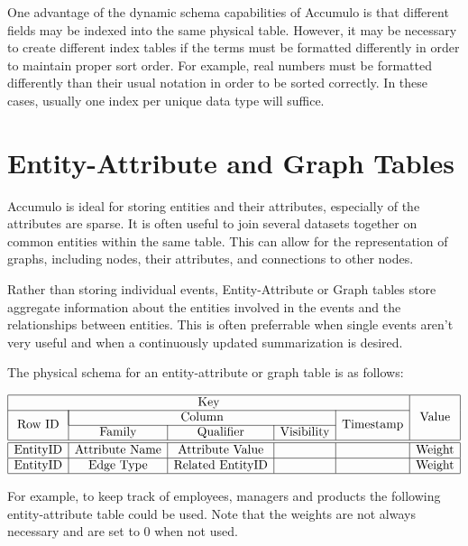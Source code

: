 One advantage of the dynamic schema capabilities of Accumulo is that different
fields may be indexed into the same physical table. However, it may be necessary to
create different index tables if the terms must be formatted differently in order to
maintain proper sort order. For example, real numbers must be formatted
differently than their usual notation in order to be sorted correctly. In these cases,
usually one index per unique data type will suffice.

\section{Entity-Attribute and Graph Tables}

Accumulo is ideal for storing entities and their attributes, especially of the
attributes are sparse. It is often useful to join several datasets together on common
entities within the same table. This can allow for the representation of graphs,
including nodes, their attributes, and connections to other nodes.

Rather than storing individual events, Entity-Attribute or Graph tables store
aggregate information about the entities involved in the events and the
relationships between entities. This is often preferrable when single events aren't
very useful and when a continuously updated summarization is desired.

The physical schema for an entity-attribute or graph table is as follows:

\begin{center}
$\begin{array}{|c|c|c|c|c|c|} \hline
\multicolumn{5}{|c|}{\mbox{Key}} & \multirow{3}{*}{\mbox{Value}}\\ \cline{1-5}
\multirow{2}{*}{\mbox{Row ID}}& \multicolumn{3}{|c|}{\mbox{Column}} & \multirow{2}{*}{\mbox{Timestamp}} & \\ \cline{2-4}
& \mbox{Family} & \mbox{Qualifier} & \mbox{Visibility} & & \\ \hline \hline
\mbox{EntityID} & \mbox{Attribute Name} & \mbox{Attribute Value} & & & \mbox{Weight} \\ \hline
\mbox{EntityID} & \mbox{Edge Type} & \mbox{Related EntityID} & & & \mbox{Weight} \\ \hline
\end{array}$
\end{center}

For example, to keep track of employees, managers and products the following
entity-attribute table could be used. Note that the weights are not always necessary
and are set to 0 when not used.

